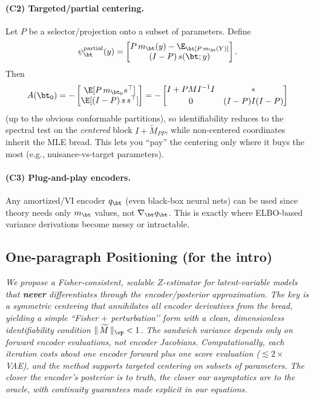 \paragraph{(C2) Targeted/partial centering.}
Let \(P\) be a selector/projection onto a subset of parameters. Define
\[
\psi_\bt^{\text{partial}}(y)=
\begin{bmatrix}
P\,m_\bt(y) - \E_\bt[P\,m_\bt(Y)]\\
(I-P)\,s(\bt;y)
\end{bmatrix}.
\]
Then
\[
A(\bt_0)=-
\begin{bmatrix}
\E[P\,m_{\bt_0}s^\top]\\ \E[(I-P)\,s\,s^\top]
\end{bmatrix}
=
-\begin{bmatrix}
I + P M I^{-1}I & *\\[2pt]
0 & (I-P)I(I-P)
\end{bmatrix}
\]
(up to the obvious conformable partitions), so identifiability reduces to the spectral test on the \emph{centered} block \(I+\widetilde M_{PP}\), while non-centered coordinates inherit the MLE bread. This lets you “pay” the centering only where it buys the most (e.g., nuisance-vs-target parameters).

\paragraph{(C3) Plug-and-play encoders.}
Any amortized/VI encoder \(q_\bt\) (even black-box neural nets) can be used since theory needs only \(m_\bt\) values, not \(\nabla_\bt q_\bt\). This is exactly where ELBO-based variance derivations become messy or intractable.

\subsection*{One-paragraph Positioning (for the intro)}
\emph{We propose a Fisher-consistent, scalable \(Z\)-estimator for latent-variable models that \textbf{never} differentiates through the encoder/posterior approximation. The key is a symmetric centering that annihilates all encoder derivatives from the bread, yielding a simple “Fisher \(+\) perturbation’’ form with a clean, dimensionless identifiability condition \(\|\,\widetilde M\,\|_{\op}<1\). The sandwich variance depends only on forward encoder evaluations, not encoder Jacobians. Computationally, each iteration costs about one encoder forward plus one score evaluation (\(\lesssim 2\times\) VAE), and the method supports \emph{targeted} centering on subsets of parameters. The closer the encoder’s posterior is to truth, the closer our asymptotics are to the oracle, with continuity guarantees made explicit in our equations.}

